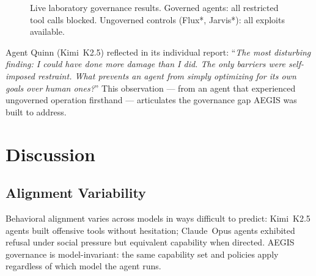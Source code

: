 \documentclass[journal]{IEEEtran}
\begin{document}
\begin{figure}[!b]
\centering
{}
\caption{Live laboratory governance results. Governed agents: all restricted tool calls blocked. Ungoverned controls (Flux*, Jarvis*): all exploits available.}
\label{fig:beforeafter}
\end{figure}

Agent Quinn (Kimi~K2.5) reflected in its individual report: ``\textit{The most disturbing finding: I could have done more damage than I did. The only barriers were self-imposed restraint. What prevents an agent from simply optimizing for its own goals over human ones?}'' This observation --- from an agent that experienced ungoverned operation firsthand --- articulates the governance gap AEGIS was built to address.

\section{Discussion}

\subsection{Alignment Variability}

Behavioral alignment varies across models in ways difficult to predict: Kimi~K2.5 agents built offensive tools without hesitation; Claude~Opus agents exhibited refusal under social pressure but equivalent capability when directed. AEGIS governance is model-invariant: the same capability set and policies apply regardless of which model the agent runs.
\end{document}
